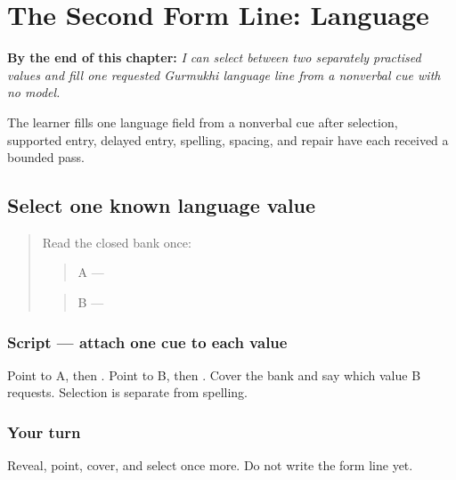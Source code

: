 
\chapter{The Second Form Line: Language}
\label{ch:pa-form-language}

\begin{chapteropening}
\textbf{By the end of this chapter:} \emph{I can select between two separately practised values and fill one requested Gurmukhi language line from a nonverbal cue with no model.}

The learner fills one language field from a nonverbal cue after selection, supported entry, delayed entry, spelling, spacing, and repair have each received a bounded pass.
\end{chapteropening}

\section[A / B (two language-value cues)]{Select one known language value}

\label{lesson:PA-W03-language-select}



\begin{quote}
Read the closed bank once:

\begin{quote}
A — \textbf{}
\end{quote}

\begin{quote}
B — \textbf{}
\end{quote}
\end{quote}

\subsection*{Script — attach one cue to each value}
Point to A, then \textbf{}. Point to B, then \textbf{}. Cover the bank and say which value B requests. Selection is separate from spelling.

\subsection*{Your turn}
Reveal, point, cover, and select once more. Do not write the form line yet.

